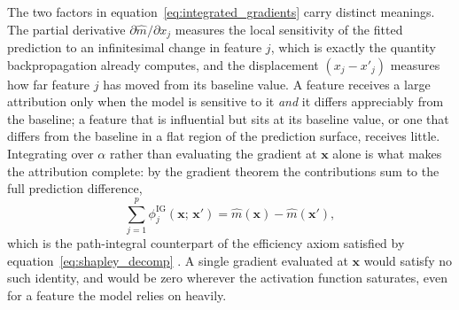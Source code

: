   \noindent
  The two factors in equation~\eqref{eq:integrated_gradients} carry
  distinct meanings. The partial derivative
  \(\partial\widehat{m}/\partial x_{j}\) measures the local sensitivity of
  the fitted prediction to an infinitesimal change in feature \(j\), which
  is exactly the quantity backpropagation already computes, and the
  displacement \((x_{j}-x'_{j})\) measures how far feature \(j\) has moved
  from its baseline value. A feature receives a large attribution only
  when the model is sensitive to it \emph{and} it differs appreciably from
  the baseline; a feature that is influential but sits at its baseline
  value, or one that differs from the baseline in a flat region of the
  prediction surface, receives little. Integrating over \(\alpha\) rather
  than evaluating the gradient at \(\mathbf{x}\) alone is what makes the
  attribution complete: by the gradient theorem the contributions sum to
  the full prediction difference,
  \begin{equation}
  \label{eq:ig_completeness}
      \sum_{j=1}^{p}
      \phi^{\mathrm{IG}}_{j}
      \!\left(
          \mathbf{x};\,\mathbf{x}'
      \right)
      =
      \widehat{m}(\mathbf{x})
      -
      \widehat{m}(\mathbf{x}'),
  \end{equation}
  which is the path-integral counterpart of the efficiency axiom
  satisfied by equation~\eqref{eq:shapley_decomp}
  \citep{sundararajan2017axiomatic}. A single gradient evaluated at
  \(\mathbf{x}\) would satisfy no such identity, and would be zero
  wherever the activation function saturates, even for a feature the model
  relies on heavily.

